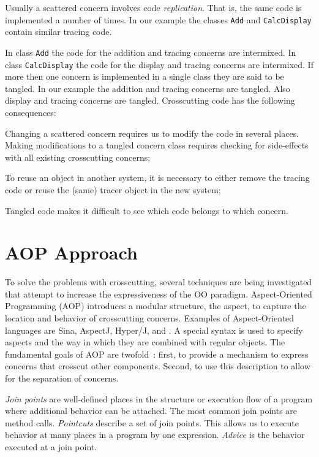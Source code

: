 Usually a scattered concern involves code \emph{replication}.
That is, the same code is implemented a number of times.
In our example the classes \lstinline|Add| and \lstinline|CalcDisplay| contain similar tracing code.

In class \lstinline|Add| the code for the addition and tracing concerns are intermixed.
In class \lstinline|CalcDisplay| the code for the display and tracing concerns are intermixed.
If more then one concern is implemented in a single class they are said to be tangled.
In our example the addition and tracing concerns are tangled.
Also display and tracing concerns are tangled.
Crosscutting code has the following consequences:
\begin{description}[style=nextline,noitemsep]
  \item[Code is difficult to change] Changing a scattered concern requires us to modify the code in several places.
Making modifications to a tangled concern class requires checking for side-effects with all existing crosscutting concerns;
  \item[Code is harder to reuse] To reuse an object in another system, it is necessary to either remove the tracing code or reuse the (same) tracer object in the new system;
  \item[Code is harder to understand] Tangled code makes it difficult to see which code belongs to which concern.
\end{description}

\section{AOP Approach}

To solve the problems with crosscutting, several techniques are being investigated that attempt to increase the expressiveness of the OO paradigm.
Aspect-Oriented Programming (AOP) introduces a modular structure, the aspect, to capture the location and behavior of crosscutting concerns.
Examples of Aspect-Oriented languages are Sina, AspectJ, Hyper/J, and \Compose*.
A special syntax is used to specify aspects and the way in which they are combined with regular objects.
The fundamental goals of AOP are twofold~\cite{gradecki:maj03}: first, to provide a mechanism to express concerns that crosscut other components.
Second, to use this description to allow for the separation of concerns.

\emph{Join points} are well-defined places in the structure or execution flow of a program where additional behavior can be attached.
The most common join points are method calls.
\emph{Pointcuts} describe a set of join points.
This allows us to execute behavior at many places in a program by one expression.
\emph{Advice} is the behavior executed at a join point.

